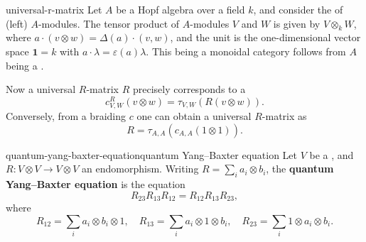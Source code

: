 \begin{example}{universal-r-matrix}
    Let $A$ be a Hopf algebra over a field $k$, and consider the  of (left) $A$-modules. The tensor product of $A$-modules $V$ and $W$ is given by $V \otimes_k W$, where $a \cdot (v \otimes w) = \Delta(a) \cdot (v, w)$, and the unit is the one-dimensional vector space $\textbf{1} = k$ with $a \cdot \lambda = \varepsilon(a) \lambda$. This being a monoidal category follows from $A$ being a .
    
    Now a universal $R$-matrix $R$ precisely corresponds to a 
    \[ c_{V, W}^R(v \otimes w) = \tau_{V, W}(R (v \otimes w)) . \]
    Conversely, from a braiding $c$ one can obtain a universal $R$-matrix as
    \[ R = \tau_{A, A}(c_{A, A}(1 \otimes 1)) . \]
\end{example}

\begin{topic}{quantum-yang-baxter-equation}{quantum Yang--Baxter equation}
    Let $V$ be a , and $R : V \otimes V \to V \otimes V$ an endomorphism. Writing $R = \sum_i a_i \otimes b_i$, the \textbf{quantum Yang--Baxter equation} is the equation
    \[ R_{23} R_{13} R_{12} = R_{12} R_{13} R_{23} , \]
    where
    \[ R_{12} = \sum_i a_i \otimes b_i \otimes 1, \quad R_{13} = \sum_i a_i \otimes 1 \otimes b_i, \quad R_{23} = \sum_i 1 \otimes a_i \otimes b_i . \]
\end{topic}

